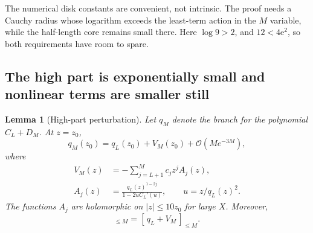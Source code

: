 \documentclass[11pt,a4paper]{article}
\newtheorem{lemma}[theorem]{Lemma}
\theoremstyle{definition}
\numberwithin{equation}{section}
\newcommand{\e}{\mathrm e}
\newcommand{\Oh}{\mathcal O}
\newcommand{\trunc}[2]{[\,#1\,]_{\le #2}}
\begin{document}
The numerical disk constants are convenient, not intrinsic. The proof needs a Cauchy radius whose logarithm exceeds the least-term action in the $M$ variable, while the half-length core remains small there. Here $\log9>2$, and $12<4\e^2$, so both requirements have room to spare.

\subsection{The high part is exponentially small and nonlinear terms are smaller still}
\begin{lemma}[High-part perturbation]
\label{lem:high}
Let $q_M$ denote the branch for the polynomial $C_L+D_M$. At $z=z_0$,
\begin{equation}
 q_M(z_0)=q_L(z_0)+V_M(z_0)+\Oh(Me^{-3M}),
 \label{eq:linearhigh}
\end{equation}
where
\begin{align}
 V_M(z)&=-\sum_{j=L+1}^Mc_jz^jA_j(z),\label{eq:V}\\
 A_j(z)&=\frac{q_L(z)^{1-2j}}
          {1-2uC_L'(u)},\qquad u=z/q_L(z)^2.
 \label{eq:Aj}
\end{align}
The functions $A_j$ are holomorphic on $|z|\le10z_0$ for large $X$. Moreover,
\begin{equation}
 \trunc{q_M}{M}=\trunc{q_L+V_M}{M}.
 \label{eq:formalcut}
\end{equation}
\end{lemma}
\end{document}
